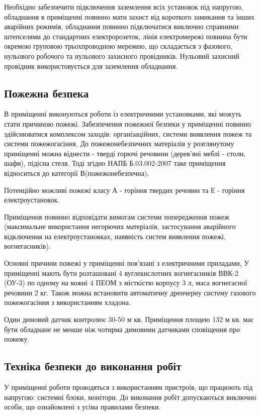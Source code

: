     Необхідно забезпечити підключення заземлення всіх установок під напругою, обладнання в приміщенні повинно мати захист від короткого замикання та інших аварійних режимів, обладнання повинно підключатися виключно справними штепселями до стандартних електророзеток, лінія електромережі повинна бути окремою груповою трьохпроводною мережею, що складається з фазового, нульового робочого та нульового захисного провідників. Нульовий захисний провідник використовується для заземлення обладнання.

\subsection{Пожежна безпека}
    В приміщенні виконуються роботи із електричними установками, які можуть стати причиною пожежі. Забезпечення пожежної безпеки у приміщенні повинно здійснюватися комплексом заходів: організаційних, системи виявлення пожеж та системи пожежогасіння.
    До пожежонебезпечних матеріалів у розглянутому приміщенні можна віднести - тверді горючі речовини (дерев'яні меблі - столи, шафи), підісна стеля. Тоді згідно НАПБ Б.03.002-2007\cite{lab-napb} таке приміщення відноситься до категорії В(пожежонебезпечна).

    Потенційно можливі пожежі класу А - горіння твердих речовин та Е - горіння електроустановок.

    Приміщення повинно відповідати вимогам системи попередження пожеж (максимальне використання негорючих матеріалів, застосування аварійного відключення на електроустановках, наявність систем виявлення пожежі, вогнегасників).

    Основні причини пожежі у приміщенні пов'язані з електричними приладами, У приміщенні мають бути розташовані 4 вуглекислотних вогнегасників ВВК-2 (ОУ-3) по одному на кожні 4 ПЕОМ з місткістю корпусу 3 л,  маса вогнегасної речовини 2 кг. Також можна встановити автоматичну дренчерну систему газового пожежогасіння з використанням хладона.

    Один димовий датчик контролює 30-50 м кв. Приміщення площею 132 м кв. має бути обладнане не менше ніж чотирма димовими датчиками сповіщення про пожежу.

\subsection{Техніка безпеки до виконання робіт}
    У приміщенні роботи проводяться з використанням пристроїв, що працюють під напругою: системні блоки, монітори. До виконання робіт допускаються виключно особи, що ознайомлені з усіма правилами безпеки.

